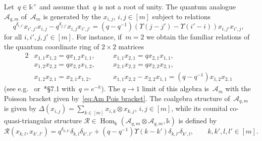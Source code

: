 \documentclass[12pt, reqno]{amsart}
\theoremstyle{definition}
\numberwithin{equation}{section}
\newcommand{\tensor}{\otimes}
\newcommand{\kk}{\mathbb{k}}\newcommand{\lie}[1]{{\mathfrak{#1}}}
\DeclareMathOperator{\Hom}{Hom}
\begin{document}
Let~$q\in\kk^\times$ and assume that~$q$ is not a root of unity. The quantum analogue~$\mathcal A_{q,m}$ of~$\mathcal A_m$ is
generated by the $x_{i,j}$, $i,j\in [m]$ subject to relations
\begin{equation}\label{eq:q-matrices}
q^{\delta_{i,i'}}x_{i',j'}x_{i,j}-q^{\delta_{j,j'}}
x_{i,j}x_{i',j'}=(q-q^{-1})(\Upsilon(j-j')-
\Upsilon(i'-i))x_{i,j'}x_{i',j},
\end{equation}
for all $i,i',j,j'\in[m]$.
For instance, if~$m=2$ we obtain the familiar 
relations of the quantum coordinate ring
of $2\times 2$ matrices 
\begin{alignat*}{2}
&x_{1,1}x_{1,2}=q x_{1,2}x_{1,1},&\quad&
x_{1,1}x_{2,1}=q x_{2,1}x_{1,1},\\
&x_{1,2}x_{2,2}=q x_{2,2}x_{1,2},
&&x_{2,1}x_{2,2}=q x_{2,2}x_{2,1},\\
&x_{1,2}x_{2,1}=x_{2,1}x_{1,2},&&
x_{1,1}x_{2,2}-x_{2,2}x_{1,1}=(q-q^{-1})x_{1,2}x_{2,1}
\end{alignat*}
(see e.g.~\cite{Ge} or~\cite{CPbook}*{\S7.1} with~$q=e^{-h}$). 
The $q\to 1$ limit 
of this algebra is~$\mathcal A_m$
with the Poisson bracket given by~\eqref{eq:Am Pois bracket}. The coalgebra structure of~$\mathcal A_{q,m}$ is given by
$\Delta(x_{i,j})=\sum_{k\in[m]}x_{i,k}\tensor x_{k,j}$,
$i,j\in[m]$, while its counital co-quasi-triangular structure
$\mathcal R\in\Hom_\kk(\mathcal A_{q,m}\tensor\mathcal A_{q,m},\kk)$ is defined by
$$
\mathcal R(x_{k,l},x_{k',l'})=q^{\delta_{k,k'}}\delta_{k,l}\delta_{k',l'}
+(q-q^{-1})\Upsilon(k-k')\delta_{k,l'}\delta_{k',l},
\qquad k,k',l,l'\in[m].
$$
\end{document}
